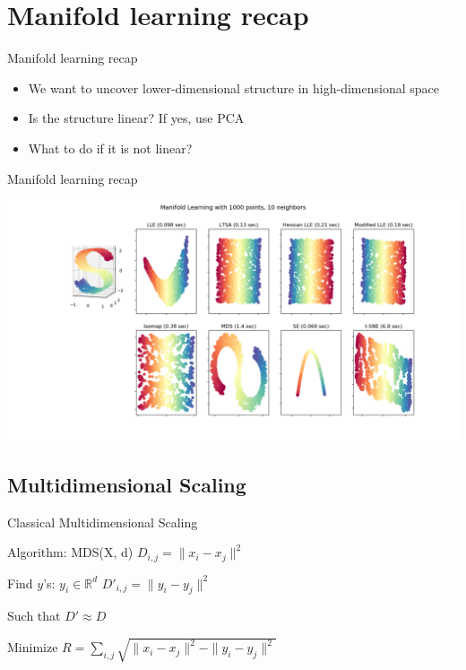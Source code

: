 \documentclass[unknownkeysallowed]{beamer}
\begin{document}
\section{Manifold learning recap}
\begin{frame}{Manifold learning recap}

	\begin{itemize}
	\item We want to uncover lower-dimensional structure in high-dimensional space
	\item Is the structure linear? If yes, use PCA
	\item What to do if it is not linear?
	\end{itemize}
\end{frame}
\begin{frame}{Manifold learning recap}



	\includegraphics[width=\textwidth,height=0.8\textheight,keepaspectratio]{manifold_algorithms}

\end{frame}

\subsection{Multidimensional Scaling}
\begin{frame}{Classical Multidimensional Scaling}

	\begin{block}{Algorithm: MDS(X, d)}
	$D_{i,j} = \|x_i - x_j\|^2$

	Find $y$'s: $y_i \in \mathbb{R}^d$
	\break
	$D'_{i,j} = \|y_i - y_j\|^2$ 

	Such that $D' \approx D$
	
	Minimize $R = \sum_{i, j}\sqrt{\|x_i - x_j\|^2 - \|y_i - y_j\|^2}$
	\end{block}
	

\end{frame}
\end{document}
